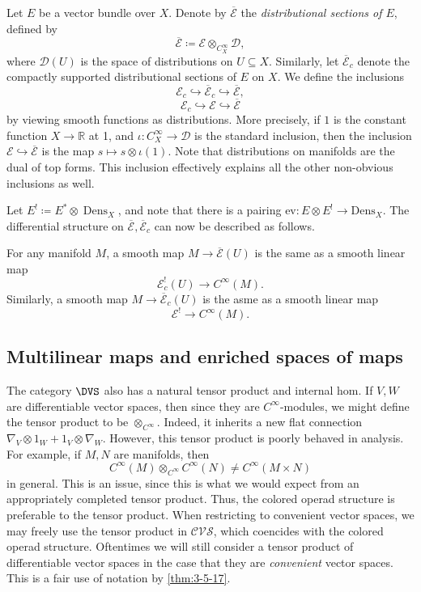 Let $E$ be a vector bundle over $X$. Denote by $\overline{\mathcal{E} } $ the \emph{distributional sections of $E$}, defined by
\[
	\overline{\mathcal{E} } \coloneqq \mathcal{E} \otimes _{C^\infty_X} \mathcal{D} 
,\]
where $\mathcal{D}(U)$ is the space of distributions on $U\subseteq X$. Similarly, let $\overline{\mathcal{E} } _c$ denote the compactly supported distributional sections of $E$ on $X$. We define the inclusions
\[
	\mathcal{E} _c \hookrightarrow \overline{\mathcal{E} } _c \hookrightarrow \overline{\mathcal{E} } ,
\]
\[
	\mathcal{E} _c \hookrightarrow \mathcal{E} \hookrightarrow \overline{\mathcal{E} } 
\]
by viewing smooth functions as distributions. More precisely, if $1$ is the constant function $X\to \mathbb{R} $ at 1, and $\iota : C^\infty _X \to \mathcal{D} $ is the standard inclusion, then the inclusion $\mathcal{E} \hookrightarrow \overline{\mathcal{E} } $ is the map $s\mapsto s\otimes \iota (1)$. Note that distributions on manifolds are the dual of top forms. This inclusion effectively explains all the other non-obvious inclusions as well.

Let $E^! \coloneqq E^* \otimes \operatorname{Dens}_X$, and note that there is a pairing $\mathrm{ev} : E\otimes E^! \to \mathrm{Dens}_X$. The differential structure on $\overline{\mathcal{E} } ,\overline{\mathcal{E} } _c$ can now be described as follows.
\begin{theorem}\label{thm:3-5-19}
	For any manifold $M$, a smooth map $M\to \overline{\mathcal{E} } (U)$ is the same as a smooth linear map
	\[
		\mathcal{E} ^!_c(U) \to C^\infty (M)
	.\]
	Similarly, a smooth map $M\to \overline{\mathcal{E} } _c(U)$ is the asme as a smooth linear map
	\[
		\mathcal{E} ^! \to C^\infty (M)
	.\]
\end{theorem}

\subsection{Multilinear maps and enriched spaces of maps}

The category $\DVS $ also has a natural tensor product and internal hom. If $V,W$ are differentiable vector spaces, then since they are $C^\infty $-modules, we might define the tensor product to be $\otimes _{C^\infty } $. Indeed, it inherits a new flat connection $\nabla _V \otimes 1_W + 1_V \otimes \nabla _W$. However, this tensor product is poorly behaved in analysis. For example, if $M,N$ are manifolds, then
\[
	C^\infty (M) \otimes _{C^\infty } C^\infty (N) \neq C^\infty (M\times N)
\]
in general. This is an issue, since this is what we would expect from an appropriately completed tensor product. Thus, the colored operad structure is preferable to the tensor product. When restricting to convenient vector spaces, we may freely use the tensor product in $\mathcal{CVS} $, which coencides with the colored operad structure. Oftentimes we will still consider a tensor product of differentiable vector spaces in the case that they are \emph{convenient} vector spaces. This is a fair use of notation by \cref{thm:3-5-17}.

